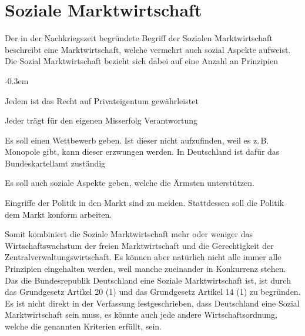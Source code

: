 \documentclass{article}
\begin{document}
 
 
\section{Soziale Marktwirtschaft}
\begin{multicols}{1}
\noindent Der in der Nachkriegszeit begründete Begriff der Sozialen Marktwirtschaft beschreibt eine Marktwirtschaft, welche vermehrt auch sozial Aspekte aufweist. \newline
Die Sozial Marktwirtschaft bezieht sich dabei auf eine Anzahl an Prinzipien
\begin{description}
 \itemsep-0.3em 
 \item[Eigentumsprinzip] Jedem ist das Recht auf Privateigentum gewährleistet 
 \item[Haftungsprinzip] Jeder trägt für den eigenen Misserfolg Verantwortung
 \item[Wettbewerbsprinzip] Es soll einen Wettbewerb geben. Ist dieser nicht aufzufinden, weil es z.\,B. Monopole gibt, kann dieser erzwungen werden. In Deutschland ist dafür das Bundeskartellamt zuständig
 \item[Sozialprinzip] Es soll auch soziale Aspekte geben, welche die Ärmsten unterstützen.
 \item[Marktkonformitätsprinzip] Eingriffe der Politik in den Markt sind zu meiden. Stattdessen soll die Politik dem Markt konform arbeiten.
\end{description}
\columnbreak 
Somit kombiniert die Soziale Marktwirtschaft mehr oder weniger das Wirtschaftswachstum der freien Marktwirtschaft und die Gerechtigkeit der Zentralverwaltungswirtschaft. Es können aber natürlich nicht alle immer alle Prinzipien eingehalten werden, weil manche zueinander in Konkurrenz stehen. \newline 
Das die Bundesrepublik Deutschland eine Soziale Marktwirtschaft ist, ist durch das Grundgesetz Artikel 20 (1)  und das Grundgesetz Artikel 14 (1)  zu begründen. Es ist nicht direkt in der Verfassung festgeschrieben, dass Deutschland eine Sozial Marktwirtschaft sein muss, es könnte auch jede andere Wirtschaftsordnung, welche die genannten Kriterien erfüllt, sein.
\end{multicols}
 
\end{document}
